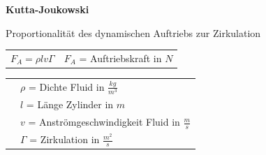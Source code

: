 				\begin{minipage}[t]{13cm}
					\textbf{Kutta-Joukowski}
					\begin{flushleft}
						Proportionalität des dynamischen Auftriebs zur Zirkulation
					\end{flushleft}
					\renewcommand{\arraystretch}{2.5}
					\begin{tabular}{ p{5cm} | p{7cm}}
						$F_A = \rho lv \Gamma$	&	$F_A$ = Auftriebskraft in $N$\\
					\end{tabular}
					\renewcommand{\arraystretch}{1.5}
					\begin{tabular}{ p{5cm} | p{7cm} }
						& $\rho$ = Dichte Fluid in $\frac{kg}{m^3}$\\
						& $l$ = Länge Zylinder in $m$\\
						& $v$ = Anströmgeschwindigkeit Fluid in $\frac{m}{s}$\\
						& $\Gamma$ = Zirkulation in $\frac{m^2}{s}$
					\end{tabular} 
					\renewcommand{\arraystretch}{1}
				\end{minipage}
			
